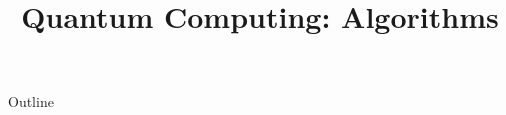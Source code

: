 \documentclass[xcolor=dvipsnames,compress,t,pdf,9pt]{beamer}
\title[\insertframenumber /\inserttotalframenumber]{Quantum Computing: Algorithms}
\begin{document}
	\begin{frame}
	\titlepage
	\end{frame}

	\begin{frame}{Outline}
	    \tableofcontents
	\end{frame}

	
	
	
	
\end{document}

